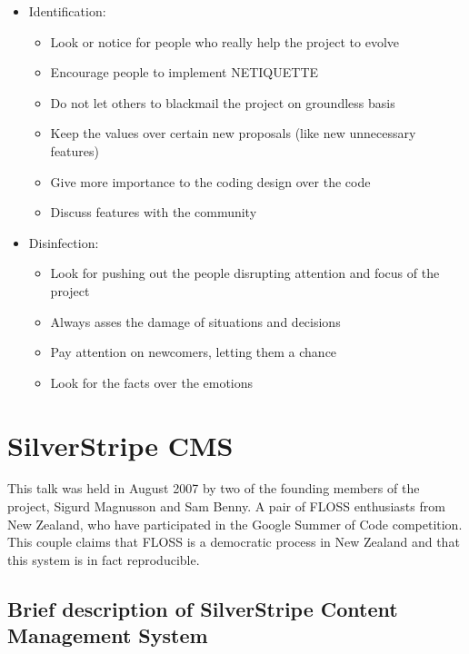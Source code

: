 \documentclass[11pt]{article} %
\begin{document}
\begin{itemize}
  \item Identification:
  	\begin{itemize}
  		\item Look or notice for people who really help the project to evolve
  		\item Encourage people to implement NETIQUETTE
  		\item Do not let others to blackmail the project on groundless basis
  		\item Keep the values over certain new proposals (like new unnecessary features)
  		\item Give more importance to the coding design over the code
  		\item Discuss features with the community
  	\end{itemize}
  
  \item Disinfection:
  	\begin{itemize}
  		\item Look for pushing out the people disrupting attention and focus of the project
  		\item Always asses the damage of situations and decisions
  		\item Pay attention on newcomers, letting them a chance
  		\item Look for the facts over the emotions
  	\end{itemize}
    
\end{itemize}



\section{SilverStripe CMS}


This talk was held in August 2007 by two of the founding members of the project, Sigurd Magnusson and Sam Benny. A pair of FLOSS  enthusiasts from New Zealand, who have participated in the Google Summer of Code competition. This couple claims that FLOSS is a democratic process in New Zealand and that this system is in fact reproducible.

\subsection{Brief description of SilverStripe Content Management System}
\end{document}
